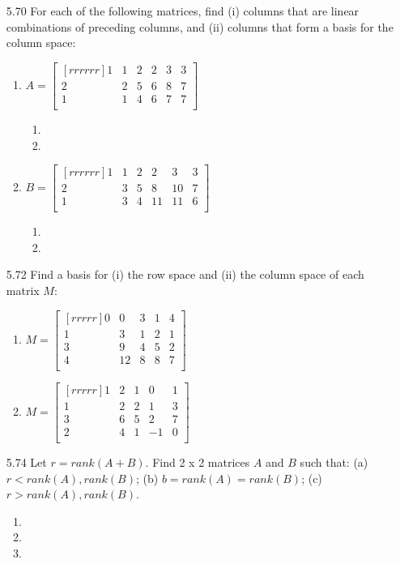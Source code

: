 \documentclass[12pt]{article}
\begin{document}
\begin{enumerate}
\item[5.70] For each of the following matrices, find (i) columns that are linear combinations of preceding columns, and (ii) columns that form a basis for the column space:
	\begin{enumerate}
	\item $A=\begin{bmatrix}[rrrrrr]1&1&2&2&3&3\\2&2&5&6&8&7\\1&1&4&6&7&7\\\end{bmatrix}$
		\begin{enumerate}
		\item
		\item		
		\end{enumerate}			
	\item $B=\begin{bmatrix}[rrrrrr]1&1&2&2&3&3\\2&3&5&8&10&7\\1&3&4&11&11&6\\\end{bmatrix}$
		\begin{enumerate}
		\item
		\item
		\end{enumerate}			
	\end{enumerate}

\item[5.72] Find a basis for (i) the row space and (ii) the column space of each matrix $M$:
	\begin{enumerate}
	\item $M=\begin{bmatrix}[rrrrr]0&0&3&1&4\\1&3&1&2&1\\3&9&4&5&2\\4&12&8&8&7\\\end{bmatrix}$
	\item $M=\begin{bmatrix}[rrrrr]1&2&1&0&1\\1&2&2&1&3\\3&6&5&2&7\\2&4&1&-1&0\\\end{bmatrix}$
	\end{enumerate}

\item[5.74] Let $r=rank(A+B)$. Find 2 x 2 matrices $A$ and $B$ such that: (a) $r<rank(A),rank(B)$; (b) $b=rank(A)=rank(B)$; (c) $r>rank(A),rank(B)$.
	\begin{enumerate}
	\item
	\item
	\item
	\end{enumerate}


\end{enumerate}
\end{document}
